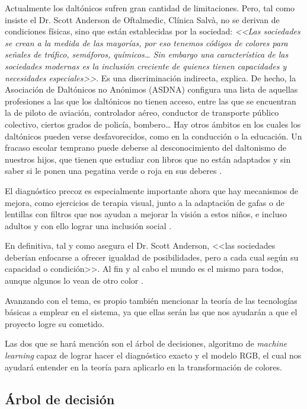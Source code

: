 \documentclass[10pt]{article}
\begin{document}
Actualmente los daltónicos sufren gran cantidad de limitaciones. Pero, tal como insiste el Dr. Scott Anderson de Oftalmedic, Clínica Salvà, no se derivan de condiciones físicas, sino que están establecidas por la sociedad: \textit{<<Las sociedades se crean a la medida de las mayorías, por eso tenemos códigos de colores para señales de tráfico, semáforos, químicos… Sin embargo una característica de las sociedades modernas es la inclusión creciente de quienes tienen capacidades y necesidades especiales>>}. Es una discriminación indirecta, explica. De hecho, la Asociación de Daltónicos no Anónimos (ASDNA) configura una lista de aquellas profesiones a las que los daltónicos no tienen acceso, entre las que se encuentran la de piloto de aviación, controlador aéreo, conductor de transporte público colectivo, ciertos grados de policía, bombero…
Hay otros ámbitos en los cuales los daltónicos pueden verse desfavorecidos, como en la conducción o la educación. Un fracaso escolar temprano puede deberse al desconocimiento del daltonismo de nuestros hijos, que tienen que estudiar con libros que no están adaptados y sin saber si le ponen una pegatina verde o roja en sus deberes \cite{IEEEreferencias:Ref33}.

El diagnóstico precoz es especialmente importante ahora que hay mecanismos de mejora, como ejercicios de terapia visual, junto a la adaptación de gafas o de lentillas con filtros que nos ayudan a mejorar la visión a estos niños, e incluso adultos y con ello lograr una inclusión social \cite{IEEEreferencias:Ref26}.

En definitiva, tal y como asegura el Dr. Scott Anderson, <<las sociedades deberían enfocarse a ofrecer igualdad de posibilidades, pero a cada cual según su capacidad o condición>>. Al fin y al cabo el mundo es el mismo para todos, aunque algunos lo vean de otro color \cite{IEEEreferencias:Ref33}.

Avanzando con el tema, es propio también mencionar la teoría de las tecnologías básicas a emplear en el sistema, ya que ellas serán las que nos ayudarán a que el proyecto logre su cometido.

Las dos que se hará mención son el árbol de decisiones, algoritmo de \textit{machine learning} capaz de lograr hacer el diagnóstico exacto y el modelo RGB, el cual nos ayudará entender en la teoría para aplicarlo en la transformación de colores. 


\subsection{Árbol de decisión}
\end{document}
